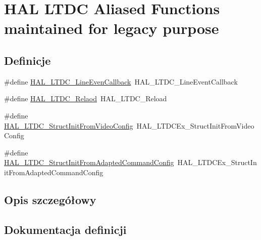 \hypertarget{group___h_a_l___l_t_d_c___aliased___functions}{}\section{H\+AL L\+T\+DC Aliased Functions maintained for legacy purpose}
\label{group___h_a_l___l_t_d_c___aliased___functions}
\subsection*{Definicje}
\begin{DoxyCompactItemize}
\item 
\#define \hyperlink{group___h_a_l___l_t_d_c___aliased___functions_ga9db84d8e2888690969d2cb8db7b96d0e}{H\+A\+L\+\_\+\+L\+T\+D\+C\+\_\+\+Line\+Even\+Callback}~H\+A\+L\+\_\+\+L\+T\+D\+C\+\_\+\+Line\+Event\+Callback
\item 
\#define \hyperlink{group___h_a_l___l_t_d_c___aliased___functions_gad1e34250a1cd7818eb43a6ba601508c2}{H\+A\+L\+\_\+\+L\+T\+D\+C\+\_\+\+Relaod}~H\+A\+L\+\_\+\+L\+T\+D\+C\+\_\+\+Reload
\item 
\#define \hyperlink{group___h_a_l___l_t_d_c___aliased___functions_gaab10aa276becaede12de0aa022179a19}{H\+A\+L\+\_\+\+L\+T\+D\+C\+\_\+\+Struct\+Init\+From\+Video\+Config}~H\+A\+L\+\_\+\+L\+T\+D\+C\+Ex\+\_\+\+Struct\+Init\+From\+Video\+Config
\item 
\#define \hyperlink{group___h_a_l___l_t_d_c___aliased___functions_gaae7d5975926b94dfa67bff3a3f7cae1c}{H\+A\+L\+\_\+\+L\+T\+D\+C\+\_\+\+Struct\+Init\+From\+Adapted\+Command\+Config}~H\+A\+L\+\_\+\+L\+T\+D\+C\+Ex\+\_\+\+Struct\+Init\+From\+Adapted\+Command\+Config
\end{DoxyCompactItemize}


\subsection{Opis szczegółowy}


\subsection{Dokumentacja definicji}
\mbox{\label{group___h_a_l___l_t_d_c___aliased___functions_ga9db84d8e2888690969d2cb8db7b96d0e}} 
